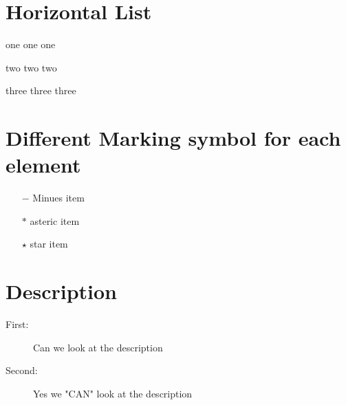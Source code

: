 \documentclass[a4paper,12pt]{article}
\begin{document}
	
	\section{Horizontal List}
		\begin{enumerate*}
			\item one one one
			\item two two two
			\item three three three
		\end{enumerate*}
	\section{Different Marking symbol for each element}
		\begin{enumerate}
			\item[$-$]        Minues item
			\item[$\ast$]    asteric item
			\item[$\star$]   star item
		\end{enumerate}
	\section{Description}
		\begin{description}
			\item[First:] Can we look at the  description
			\item[Second:] Yes we "CAN" look at the  description
	    \end{description}
		
\end{document}
